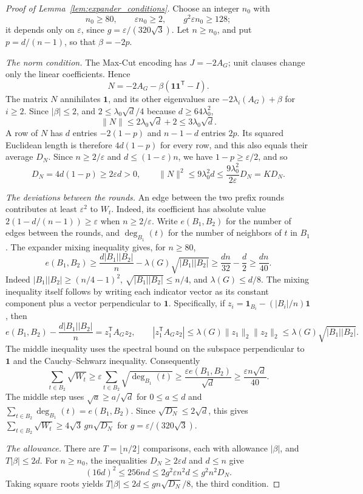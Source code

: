 \documentclass[11pt,a4paper]{article}
\theoremstyle{definition}
\theoremstyle{remark}
\newcommand{\ind}{\mathbf 1}
\begin{document}
\begin{proof}[Proof of Lemma~\ref{lem:expander_conditions}]
Choose an integer $n_0$ with
\[
 n_0\ge80,\qquad \varepsilon n_0\ge2,\qquad g^2\varepsilon n_0\ge128;
\]
it depends only on $\varepsilon$, since $g=\varepsilon/(320\sqrt3)$.
Let $n\ge n_0$, and put $p=d/(n-1)$, so that $\beta=-2p$.

\emph{The norm condition.} The Max-Cut encoding has $J=-2A_G$; unit clauses
change only the linear coefficients. Hence
\[
 N=-2A_G-\beta(\ind\ind^{\mathsf T}-I).
\]
The matrix $N$ annihilates $\ind$, and its other eigenvalues are
$-2\lambda_i(A_G)+\beta$ for $i\ge2$. Since $|\beta|\le2$, and
$2\le\lambda_0\sqrt d/4$ because $d\ge64\lambda_0^2$,
\[
 \|N\|\le2\lambda_0\sqrt d+2\le3\lambda_0\sqrt d.
\]
A row of $N$ has $d$ entries $-2(1-p)$ and $n-1-d$ entries $2p$. Its
squared Euclidean length is therefore $4d(1-p)$ for every row, and this
also equals their average $D_N$. Since $n\ge2/\varepsilon$ and
$d\le(1-\varepsilon)n$, we have $1-p\ge\varepsilon/2$, and so
\[
 D_N=4d(1-p)\ge2\varepsilon d>0,\qquad
 \|N\|^2\le9\lambda_0^2d\le\frac{9\lambda_0^2}{2\varepsilon}D_N=KD_N.
\]

\emph{The deviations between the rounds.} An edge between the two prefix rounds contributes at least
$\varepsilon^2$ to $W_t$. Indeed, its coefficient has absolute value
$2(1-d/(n-1))\ge\varepsilon$ when $n\ge2/\varepsilon$.
Write $e(B_1,B_2)$ for the number of edges between the rounds, and
$\deg_{B_1}(t)$ for the number of neighbors of $t$ in $B_1$.
The expander mixing inequality gives, for $n\ge80$,
\[
 e(B_1,B_2)\ge \frac{d|B_1||B_2|}{n}
           -\lambda(G)\sqrt{|B_1||B_2|}
 \ge\frac{dn}{32}-\frac d2\ge\frac{dn}{40}.
\]
Indeed $|B_1||B_2|\ge(n/4-1)^2$,
$\sqrt{|B_1||B_2|}\le n/4$, and $\lambda(G)\le d/8$.
The mixing inequality itself follows by writing each indicator vector
as its constant component plus a vector perpendicular to $\ind$.
Specifically, if
$z_i=\mathbf 1_{B_i}-(|B_i|/n)\ind$, then
\[
 e(B_1,B_2)-\frac{d|B_1||B_2|}{n}=z_1^{\mathsf T}A_Gz_2,
 \qquad
 |z_1^{\mathsf T}A_Gz_2|
 \le\lambda(G)\|z_1\|_2\|z_2\|_2
 \le\lambda(G)\sqrt{|B_1||B_2|}.
\]
The middle inequality uses the spectral bound on the subspace
perpendicular to $\ind$ and the Cauchy--Schwarz inequality.
Consequently
\[
 \sum_{t\in B_2}\sqrt{W_t}
 \ge\varepsilon\sum_{t\in B_2}\sqrt{\deg_{B_1}(t)}
 \ge\frac{\varepsilon e(B_1,B_2)}{\sqrt d}
 \ge\frac{\varepsilon n\sqrt d}{40}.
\]
The middle step uses $\sqrt a\ge a/\sqrt d$ for $0\le a\le d$
and $\sum_{t\in B_2}\deg_{B_1}(t)=e(B_1,B_2)$.
Since $\sqrt{D_N}\le2\sqrt d$, this gives
$\sum_{t\in B_2}\sqrt{W_t}\ge4\sqrt3\,gn\sqrt{D_N}$ for
$g=\varepsilon/(320\sqrt3)$.

\emph{The allowance.} There are $T=\lfloor n/2\rfloor$ comparisons, each
with allowance $|\beta|$, and $T|\beta|\le2d$. For $n\ge n_0$, the
inequalities $D_N\ge2\varepsilon d$ and $d\le n$ give
\[
 (16d)^2\le256nd\le2g^2\varepsilon n^2d\le g^2n^2D_N.
\]
Taking square roots yields $T|\beta|\le2d\le gn\sqrt{D_N}/8$, the third
condition.
\end{proof}
\end{document}
